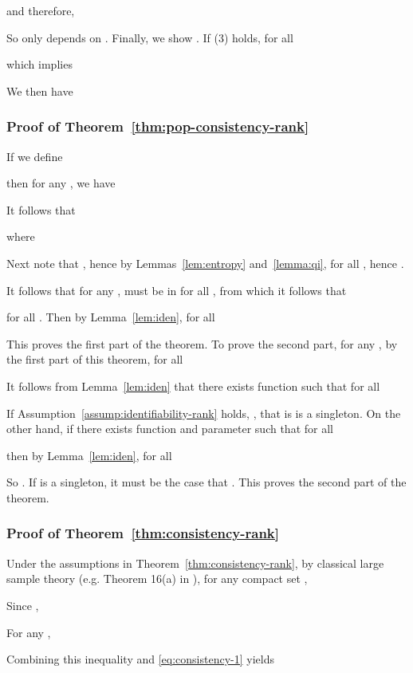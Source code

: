 \documentclass[11pt,a4paper]{article}
\begin{document}
and therefore, 

So  only depends on . 
Finally, we show . If (3) holds, for all 

which implies

We then have 







\subsubsection{Proof of Theorem~\ref{thm:pop-consistency-rank}}
\label{sec:pf-pop-consis-ranking}
If we define 

then for any ,
we have

It follows that 

where

Next note that , hence by
Lemmas~\ref{lem:entropy} and~\ref{lemma:qi},  for all , hence
.

It follows that for any ,  must be in  for all , from which it follows
that 

for all . Then by Lemma~\ref{lem:iden},
for all 

This proves the first part of the theorem. To prove the second part, for any , by the first part of this theorem, for all 

It follows from Lemma~\ref{lem:iden} that there exists function  such that for all 

If Assumption~\ref{assump:identifiability-rank} holds, , that is  is a singleton. 
On the other hand, if there exists function  and parameter  such that for all 

then by Lemma~\ref{lem:iden}, for all 

So . If  is a singleton, it must be the case that . This proves the second part of the theorem. 





\subsubsection{Proof of Theorem~\ref{thm:consistency-rank}}
\label{sec:pf-consis-ranking}
Under the assumptions in Theorem~\ref{thm:consistency-rank}, by classical large sample theory (e.g. Theorem 16(a) in \cite{ferguson1996course}), for any compact set ,

Since , 

For any , 

Combining this inequality and \eqref{eq:consistency-1} yields
\end{document}

